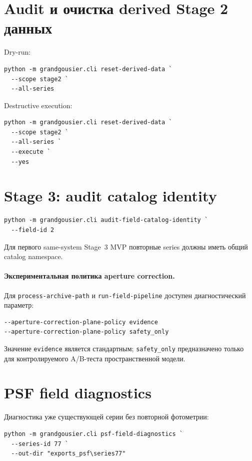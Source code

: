 \section{Audit и очистка derived Stage 2 данных}

Dry-run:

\begin{lstlisting}
python -m grandgousier.cli reset-derived-data `
  --scope stage2 `
  --all-series
\end{lstlisting}

Destructive execution:

\begin{lstlisting}
python -m grandgousier.cli reset-derived-data `
  --scope stage2 `
  --all-series `
  --execute `
  --yes
\end{lstlisting}

\section{Stage 3: audit catalog identity}

\begin{lstlisting}
python -m grandgousier.cli audit-field-catalog-identity `
  --field-id 2
\end{lstlisting}

Для первого same-system Stage~3 MVP повторные series должны иметь общий catalog namespace.


\paragraph{Экспериментальная политика aperture correction.}
Для \texttt{process-archive-path} и \texttt{run-field-pipeline} доступен диагностический параметр:
\begin{lstlisting}
--aperture-correction-plane-policy evidence
--aperture-correction-plane-policy safety_only
\end{lstlisting}
Значение \texttt{evidence} является стандартным; \texttt{safety\_only} предназначено только для контролируемого A/B-теста пространственной модели.

\section{PSF field diagnostics}

Диагностика уже существующей серии без повторной фотометрии:
\begin{lstlisting}
python -m grandgousier.cli psf-field-diagnostics `
  --series-id 77 `
  --out-dir "exports_psf\series77"
\end{lstlisting}

